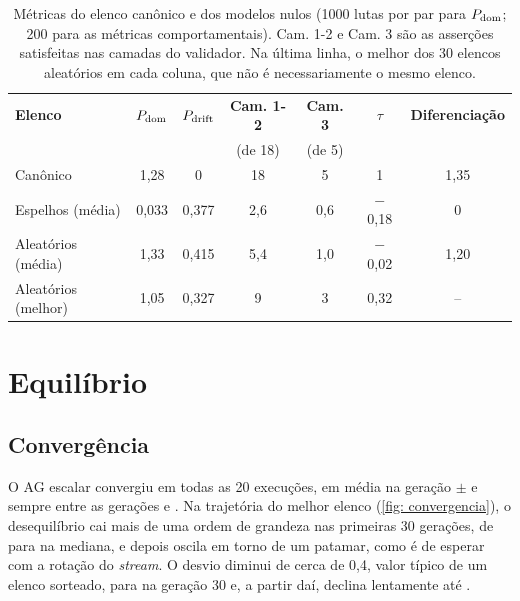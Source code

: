 \begin{table}[htb]
    \caption[Métricas do elenco canônico e dos modelos nulos]{Métricas do elenco canônico e dos modelos nulos (1000 lutas por par para $P_{\mathrm{dom}}$; 200 para as métricas comportamentais). Cam. 1-2 e Cam. 3 são as asserções satisfeitas nas camadas do validador. Na última linha, o melhor dos 30 elencos aleatórios em cada coluna, que não é necessariamente o mesmo elenco.}
    \label{tab: referencias}
    \centering
    \small
    \begin{tabular}{l c c c c c c}
        \toprule
        \textbf{Elenco} & $P_{\mathrm{dom}}$ & $P_{\mathrm{drift}}$ & \textbf{Cam. 1-2} & \textbf{Cam. 3} & $\tau$ & \textbf{Diferenciação} \\
        & & & (de 18) & (de 5) & & \\
        \midrule
        Canônico              & 1,28  & 0     & 18  & 5   & 1       & 1,35 \\
        Espelhos (média)      & 0,033 & 0,377 & 2,6 & 0,6 & $-$0,18 & 0    \\
        Aleatórios (média)    & 1,33  & 0,415 & 5,4 & 1,0 & $-$0,02 & 1,20 \\
        Aleatórios (melhor)   & 1,05  & 0,327 & 9   & 3   & 0,32    & --   \\
        \bottomrule
    \end{tabular}
    \source
\end{table}

\section{Equilíbrio}
\label{sec: res_equilibrio}

\subsection{Convergência}
\label{sub: res_convergencia}

O AG escalar convergiu em todas as 20 execuções, em média na geração \convGerMediaAG{} $\pm$ \convGerDpAG{} e sempre entre as gerações \convGerMinAG{} e \convGerMaxAG{}. Na trajetória do melhor elenco (\autoref{fig: convergencia}), o desequilíbrio cai mais de uma ordem de grandeza nas primeiras 30 gerações, de \trajDomIni{} para \trajDomTrinta{} na mediana, e depois oscila em torno de um patamar, como é de esperar com a rotação do \textit{stream}. O desvio diminui de cerca de 0,4, valor típico de um elenco sorteado, para \trajDriftTrinta{} na geração 30 e, a partir daí, declina lentamente até \trajDriftFim{}.

